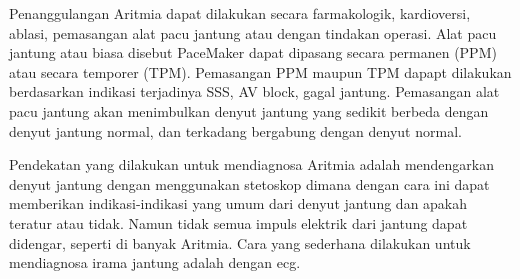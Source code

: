 Penanggulangan Aritmia dapat dilakukan secara farmakologik, kardioversi,
ablasi, pemasangan alat pacu jantung atau dengan tindakan operasi. Alat pacu
jantung atau biasa disebut PaceMaker dapat dipasang secara permanen (PPM) atau
secara temporer (TPM). Pemasangan PPM maupun TPM dapapt dilakukan berdasarkan
indikasi terjadinya SSS,  AV block, gagal jantung. Pemasangan alat pacu jantung
akan menimbulkan denyut jantung yang sedikit berbeda dengan denyut jantung
normal, dan terkadang bergabung dengan denyut normal.

 
Pendekatan yang dilakukan untuk mendiagnosa Aritmia adalah
mendengarkan denyut jantung dengan menggunakan stetoskop dimana dengan cara ini
dapat memberikan indikasi-indikasi yang umum dari denyut jantung dan apakah
teratur atau tidak. Namun tidak semua impuls elektrik dari jantung dapat
didengar, seperti di banyak Aritmia. Cara yang sederhana dilakukan
untuk mendiagnosa irama jantung adalah dengan \gls{ecg}.






